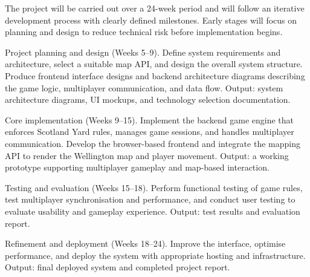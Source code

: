 \documentclass[11pt, a4paper, twoside, openright]{article}
\begin{document}
	The project will be carried out over a 24-week period and will follow an iterative development process with clearly defined milestones. Early stages will focus on planning and design to reduce technical risk before implementation begins.
	
	Project planning and design (Weeks 5–9).
	Define system requirements and architecture, select a suitable map API, and design the overall system structure. Produce frontend interface designs and backend architecture diagrams describing the game logic, multiplayer communication, and data flow.
	Output: system architecture diagrams, UI mockups, and technology selection documentation.
	
	Core implementation (Weeks 9–15).
	Implement the backend game engine that enforces Scotland Yard rules, manages game sessions, and handles multiplayer communication. Develop the browser-based frontend and integrate the mapping API to render the Wellington map and player movement.
	Output: a working prototype supporting multiplayer gameplay and map-based interaction.
	
	Testing and evaluation (Weeks 15–18).
	Perform functional testing of game rules, test multiplayer synchronisation and performance, and conduct user testing to evaluate usability and gameplay experience.
	Output: test results and evaluation report.
	
	Refinement and deployment (Weeks 18–24).
	Improve the interface, optimise performance, and deploy the system with appropriate hosting and infrastructure.
	Output: final deployed system and completed project report.
	
\end{document}
